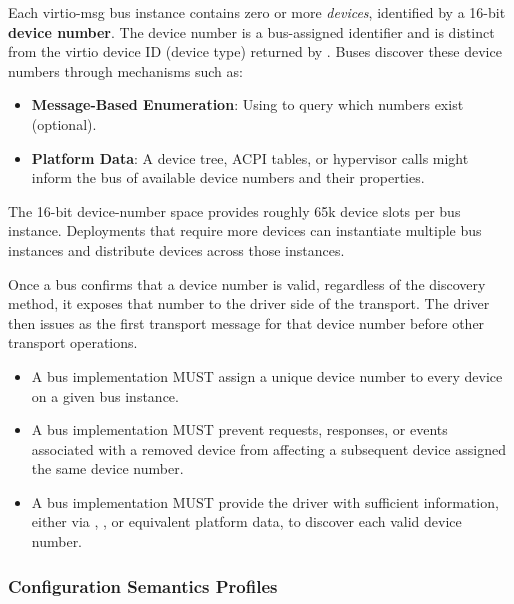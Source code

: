 Each virtio-msg bus instance contains zero or more \emph{devices}, identified
by a 16-bit \textbf{device number}. The device number is a bus-assigned
identifier and is distinct from the virtio device ID (device type) returned by
. Buses discover these device numbers through
mechanisms such as:
\begin{itemize}
  \item \textbf{Message-Based Enumeration}: Using  to query
        which numbers exist (optional).
  \item \textbf{Platform Data}: A device tree, ACPI tables, or hypervisor calls
        might inform the bus of available device numbers and their properties.
\end{itemize}

The 16-bit device-number space provides roughly 65k device slots per bus
instance. Deployments that require more devices can instantiate multiple bus
instances and distribute devices across those instances.

Once a bus confirms that a device number is valid, regardless of the discovery
method, it exposes that number to the driver side of the transport. The driver
then issues  as the first transport message for that
device number before other transport operations.

\begin{itemize}
  \item A bus implementation MUST assign a unique device number to every
        device on a given bus instance.
  \item A bus implementation MUST prevent requests, responses, or events
        associated with a removed device from affecting a subsequent device
        assigned the same device number.
  \item A bus implementation MUST provide the driver with sufficient
        information, either via , ,
        or equivalent platform data, to discover each valid device number.
\end{itemize}

\subsubsection{Configuration Semantics Profiles}
\label{sec:Virtio Transport Options / Virtio Over Messages / Basic Concepts / Configuration Semantics Profiles}

